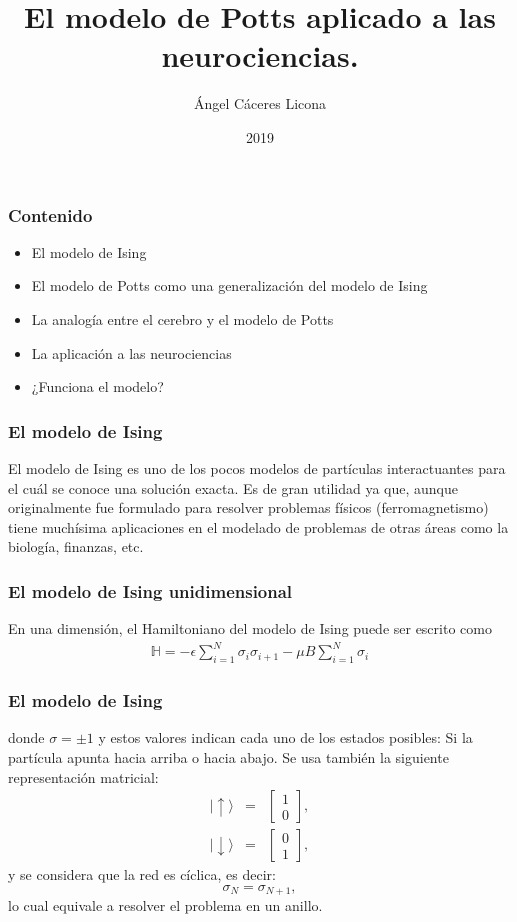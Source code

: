 \documentclass{beamer}
\title{El modelo de Potts aplicado a las neurociencias.}
\author{{Ángel Cáceres Licona}}
\institute{División de Ciencias Naturales e Ingeniería}
\date{2019}
\begin{document}
 
\frame{\titlepage}
 
\begin{frame}
\frametitle{Contenido}
\begin{itemize}
    \item El modelo de Ising
    \item El modelo de Potts como una generalización del modelo de Ising
    \item La analogía entre el cerebro y el modelo de Potts
    \item La aplicación a las neurociencias
    \item ¿Funciona el modelo?
  \end{itemize}
\end{frame}

\begin{frame}
\frametitle{El modelo de Ising}

%
El modelo de Ising es uno de los pocos modelos de part\'iculas interactuantes para el cu\'al se conoce una soluci\'on exacta. Es de gran utilidad ya que, aunque originalmente fue formulado para resolver problemas f\'isicos (ferromagnetismo) tiene much\'isima aplicaciones en el modelado de problemas de otras \'areas como la biolog\'ia, finanzas, etc.\\
\end{frame}

\begin{frame}
\frametitle{El modelo de Ising unidimensional}

En una dimensi\'on, el Hamiltoniano del modelo de Ising puede ser escrito como \\
%
\begin{eqnarray}
  \mathbb{H}=-\epsilon\sum_{i=1}^{N}\sigma_i\sigma_{i+1}-\mu B\sum_{i=1}^{N}\sigma_i \label{hamilIsing}
\end{eqnarray}

\end{frame}
\begin{frame}
\frametitle{El modelo de Ising}
%
donde $\sigma=\pm1$ y estos valores indican cada uno de los estados posibles: Si la part\'icula apunta hacia arriba o hacia abajo. Se usa tambi\'en la siguiente representaci\'on matricial:
%
\begin{eqnarray}
  |\uparrow\rangle &=&\begin{bmatrix}1\\0\end{bmatrix}\label{spinup},\\
  |\downarrow\rangle&=&\begin{bmatrix}0\\1\end{bmatrix}\label{spindown},
\end{eqnarray}
%
y se considera que la red es c\'iclica, es decir:
%
$$
\sigma_{N}=\sigma_{N+1},
$$
%
lo cual equivale a resolver el problema en un anillo.
%

\end{frame}
\end{document}
